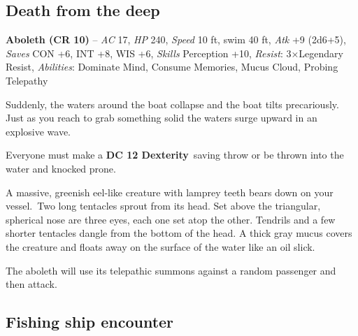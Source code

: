 \documentclass[10pt,twocolumn]{article}
\let\oldtextbf\textbf
\renewcommand{\textbf}[1]{\oldtextbf{{#1}}}
\renewenvironment{quote}
  {%
    \begingroup
      \setlength{\parindent}{1em}%
      \setlength{\parskip}{0pt}%
      \begin{tcolorbox}[myquote,
        before upper={%
          \let\textbf\oldtextbf
          \setlength{\parindent}{1.5em}%
          \setlength{\parskip}{0pt}%
          \noindent              %
        }%
      ]%
  }
  {%
      \end{tcolorbox}%
    \endgroup
  }
\begin{document}
\subsection{Death from the deep}\label{death-from-the-deep}

\begin{tcolorbox}[
  enhanced,
  breakable,
  colback={encountercolor},
  colframe=black,
  boxrule=1pt,
  coltext=black,
  arc=6pt,
  left=4pt,
  right=4pt,
  top=2pt,
  bottom=2pt,
  boxsep=4pt,
  before skip=10pt,
  after skip=10pt,
  fontupper={\blockquoteFont\small\linespread{0.9}\selectfont\color{black}}
]

\faSkull\hspace{0.8em}\begin{minipage}[t]{\dimexpr\linewidth-1.8em\hangindent=1.8em\hangafter=0}\textbf{Aboleth
(CR 10)} -- \emph{AC} 17, \emph{HP} 240, \emph{Speed} 10 ft, swim 40 ft,
\emph{Atk} +9 (2d6+5), \emph{Saves} CON +6, INT +8, WIS +6,
\emph{Skills} Perception +10, \emph{Resist}: 3×Legendary Resist,
\emph{Abilities}: Dominate Mind, Consume Memories, Mucus Cloud, Probing
Telepathy

\end{minipage}\end{tcolorbox}

\begin{quote}
Suddenly, the waters around the boat collapse and the boat tilts
precariously. Just as you reach to grab something solid the waters surge
upward in an explosive wave.
\end{quote}

Everyone must make a \textbf{DC 12 Dexterity}~saving throw or be thrown
into the water and knocked prone.

\begin{quote}
A massive, greenish eel-like creature with lamprey teeth bears down on
your vessel.~Two long tentacles sprout from its head. Set above the
triangular, spherical nose are three eyes, each one set atop the other.
Tendrils and a few shorter tentacles dangle from the bottom of the head.
A thick gray mucus covers the creature and floats away on the surface of
the water like an oil slick.
\end{quote}

The aboleth will use its telepathic summons against a random passenger
and then attack.

\subsection{Fishing ship encounter}\label{fishing-ship-encounter}
\end{document}
